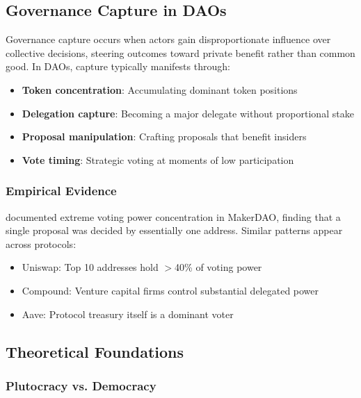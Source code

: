 
\subsection{Governance Capture in DAOs}

Governance capture occurs when actors gain disproportionate influence over collective decisions, steering outcomes toward private benefit rather than common good. In DAOs, capture typically manifests through:

\begin{itemize}
    \item \textbf{Token concentration}: Accumulating dominant token positions
    \item \textbf{Delegation capture}: Becoming a major delegate without proportional stake
    \item \textbf{Proposal manipulation}: Crafting proposals that benefit insiders
    \item \textbf{Vote timing}: Strategic voting at moments of low participation
\end{itemize}

\subsubsection{Empirical Evidence}

\citet{fritsch2022analyzing} documented extreme voting power concentration in MakerDAO, finding that a single proposal was decided by essentially one address. Similar patterns appear across protocols:

\begin{itemize}
    \item Uniswap: Top 10 addresses hold $>$40\% of voting power
    \item Compound: Venture capital firms control substantial delegated power
    \item Aave: Protocol treasury itself is a dominant voter
\end{itemize}

\subsection{Theoretical Foundations}

\subsubsection{Plutocracy vs. Democracy}


